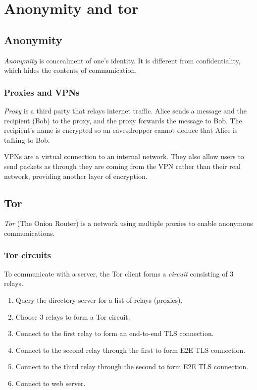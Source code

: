 \chapter{Anonymity and tor}

\section{Anonymity}
\emph{Anonymity} is concealment of one's identity. It is different from confidentiality, which hides the contents of communication.

\subsection{Proxies and VPNs}
\emph{Proxy} is a third party that relays internet traffic. Alice sends a message and the recipient (Bob) to the proxy, and the proxy forwards the message to Bob. The recipient's name is encrypted so an eavesdropper cannot deduce that Alice is talking to Bob.

\medskip
VPNs are a virtual connection to an internal network. They also allow users to send packets as through they are coming from the VPN rather than their real network, providing another layer of encryption.

\section{Tor}
\emph{Tor} (The Onion Router) is a network using multiple proxies to enable anonymous communications. 

\subsection{Tor circuits}
To communicate with a server, the Tor client forms a \emph{circuit} consisting of 3 relays.

\begin{enumerate}
    \item Query the directory server for a list of relays (proxies).
    \item Choose 3 relays to form a Tor circuit.
    \item Connect to the first relay to form an end-to-end TLS connection.
    \item Connect to the second relay through the first to form E2E TLS connection.
    \item Connect to the third relay through the second to form E2E TLS connection.
    \item Connect to web server.
\end{enumerate}

